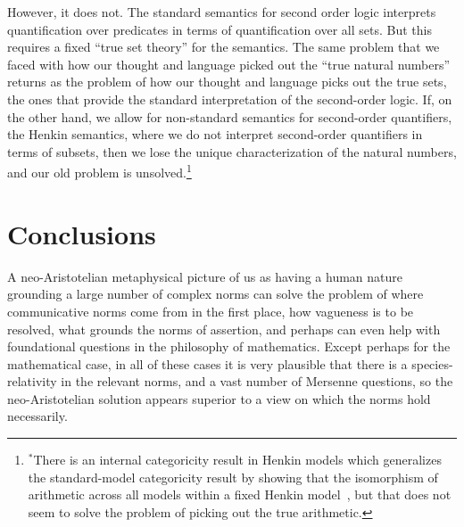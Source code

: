 However, it does not. The standard semantics for second order logic interprets quantification 
over predicates in terms of quantification over all sets. But this requires a fixed ``true set theory''
for the semantics. The same problem that we faced with how our thought and language picked out the 
``true natural numbers'' returns as the problem of how our thought and language picks out the true sets,
the ones that provide the standard interpretation of the second-order logic. If, on the other hand, we 
allow for non-standard semantics for second-order quantifiers, the Henkin semantics, where we do not 
interpret second-order quantifiers in terms of subsets, then we lose 
the unique characterization of the natural numbers, and our old problem is unsolved.\footnote{$^*$There is
an internal categoricity result in Henkin models which generalizes the standard-model categoricity
result by showing that the isomorphism of arithmetic across all models within a fixed Henkin 
model~\parencite{InternalCat}, but that does not seem to solve 
the problem of picking out the true arithmetic.}

\section{Conclusions}
A neo-Aristotelian metaphysical picture of us as having a human nature grounding a large number of complex
norms can solve the problem of where communicative norms come from in the first place, how vagueness
is to be resolved, what grounds the norms of assertion, and perhaps can even help with foundational
questions in the philosophy of mathematics. Except perhaps for the mathematical case, in all of these cases
it is very plausible that there is a species-relativity in the relevant norms, and a vast number of 
Mersenne questions, so the neo-Aristotelian solution appears superior to a view on which the norms hold necessarily.

\chaptertail

